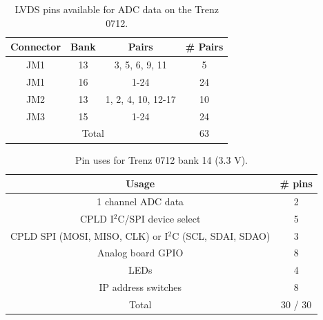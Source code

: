\documentclass[a4paper]{article}
\def\I2C{I$^2$C}
\begin{document}
\begin{table}[h]
    \begin{center}
        \caption{LVDS pins available for ADC data on the Trenz 0712.}
        \label{tab:TrenzLVDS}
        \begin{tabular}{cccc}
            \hline
            \hline
            Connector & Bank & Pairs & \# Pairs \\
            \hline
            JM1 & 13 & 3, 5, 6, 9, 11 & 5 \\
            JM1 & 16 & 1-24 & 24 \\
            JM2 & 13 & 1, 2, 4, 10, 12-17 & 10 \\
            JM3 &  15 & 1-24 & 24 \\
            \hline
            \multicolumn{3}{c}{Total} & 63 \\
            \hline
            \hline
        \end{tabular}
    \end{center}
\end{table}

\begin{table}[h]
    \begin{center}
        \caption{Pin uses for Trenz 0712 bank 14 (3.3 V).}
        \label{tab:TrenzB14}
        \begin{tabular}{cc}
            \hline
            \hline
            Usage & \# pins \\
            \hline
            1 channel ADC data & 2 \\
            CPLD \I2C/SPI device select & 5 \\
            CPLD SPI (MOSI, MISO, CLK) or \I2C (SCL, SDAI, SDAO) & 3 \\
            Analog board GPIO & 8 \\
            LEDs & 4 \\
            IP address switches & 8 \\
            \hline
            Total & 30 / 30 \\
            \hline
            \hline
        \end{tabular}
    \end{center}
\end{table}
\end{document}
